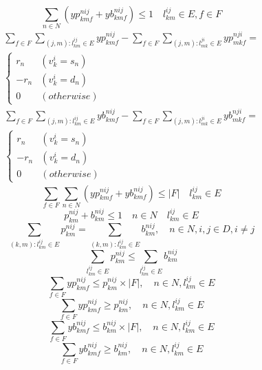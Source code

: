 \documentclass[a4j,twocolumn,fleqn]{jarticle}
\begin{document}
\begin{equation}%
\sum_{n \in N} (yp^{nij}_{kmf} + yb^{nij}_{kmf}) \leq 1 \quad l^{ij}_{km} \in E, f \in F
\end{equation}%
\begin{eqnarray}%
\sum_{f \in F}\sum_{(j,m):l^{ij}_{km}\in E}yp^{nij}_{kmf} - \sum_{f \in F}\sum_{(j,m):l^{ji}_{mk}\in E}yp^{nji}_{mkf}= \nonumber \\
\begin{cases}
r_n & (v^i_k = s_n)\\
-r_n & (v^i_k =d_n)\\
0 & (otherwise)
\end{cases}
\end{eqnarray}%
\begin{eqnarray}%
\sum_{f \in F}\sum_{(j,m):l^{ij}_{km}\in E}yb^{nij}_{kmf} - \sum_{f \in F}\sum_{(j,m):l^{ji}_{mk}\in E}yb^{nji}_{mkf}= \nonumber \\
\begin{cases}
r_n & (v^i_k = s_n)\\
-r_n & (v^i_k =d_n)\\
0 & (otherwise)
\end{cases}
\end{eqnarray}%
\begin{equation}
\sum_{f \in F} \sum_{n \in N}(yp^{nij}_{kmf}+yb^{nij}_{kmf}) \leq |F| \quad  l^{ij}_{km} \in E
\end{equation}
\begin{equation}
p^{nij}_{km} + b^{nij}_{km} \leq 1 \quad n \in N \quad l^{ij}_{km} \in E
\end{equation}
\begin{equation}
\sum_{(k,m):l^{ij}_{km}\in E}p^{nij}_{km} = \sum_{(k,m):l^{ij}_{km}\in E}b^{nij}_{km},\quad n \in N,i,j \in D, i\neq j
\end{equation}
\begin{equation}
\sum_{l^{ij}_{km}\in E}p^{nij}_{km} \leq \sum_{l^{ij}_{km}\in E}b^{nij}_{km}
\end{equation}
\begin{equation}
\sum_{f \in F}yp^{nij}_{kmf} \leq p^{nij}_{km} \times |F|,\quad n \in N,l^{ij}_{km}\in E
\end{equation}
\begin{equation}
\sum_{f \in F}yp^{nij}_{kmf} \geq p^{nij}_{km},\quad n \in N,l^{ij}_{km} \in E
\end{equation}
\begin{equation}
\sum_{f \in F}yb^{nij}_{kmf} \leq b^{nij}_{km} \times |F|,\quad n \in N,l^{ij}_{km}\in E
\end{equation}
\begin{equation}
\sum_{f \in F}yb^{nij}_{kmf} \geq b^{nij}_{km},\quad n \in N,l^{ij}_{km} \in E
\end{equation}
\end{document}
